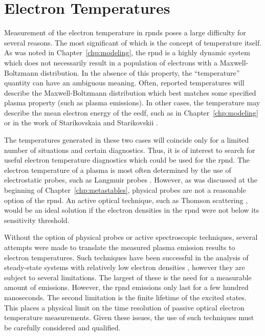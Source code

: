 \section{Electron Temperatures}

Measurement of the electron temperature in \acs{rpnd}s poses a large difficulty
for several reasons. The most significant of which is the concept of temperature
itself. As was noted in Chapter~\ref{chp:modeling}, the \acs{rpnd} is a highly
dynamic system which does not necessarily result in a population of electrons
with a Maxwell-Boltzmann distribution. In the absence of this property, the
``temperature'' quantity can have an ambiguous meaning. Often, reported
temperatures will describe the Maxwell-Boltzmann distribution which best matches
some specified plasma property (such as plasma emissions). In other cases, the
temperature may describe the mean electron energy of the \acs{eedf}, such as in
Chapter~\ref{chp:modeling} or in the work of Starikovskaia and Starikovskii
\cite{Starikovskaia2001}.

The temperatures generated in these two cases will coincide only for a limited
number of situations and certain diagnostics. Thus, it is of interest to search
for useful electron temperature diagnostics which could be used for the
\acs{rpnd}. The electron temperature of a plasma is most often determined by the
use of electrostatic probes, such as Langmuir probes \cite{Lieberman2005}.
However, as was discussed at the beginning of Chapter~\ref{chp:metastables},
physical probes are not a reasonable option of the \acs{rpnd}. An active optical
technique, such as Thomson scattering \cite{VanGessel2012}, would be an ideal
solution if the electron densities in the \acs{rpnd} were not below its
sensitivity threshold.

Without the option of physical probes or active spectroscopic techniques,
several attempts were made to translate the measured plasma emission results to
electron temperatures. Such techniques have been successful in the analysis of
steady-state systems with relatively low electron densities \cite{Kunze2009},
however they are subject to several limitations. The largest of these is the
need for a measurable amount of emissions. However, the \acs{rpnd} emissions
only last for a few hundred nanoseconds. The second limitation is the finite
lifetime of the excited states. This places a physical limit on the time
resolution of passive optical electron temperature measurements. Given these
issues, the use of such techniques must be carefully considered and qualified.

